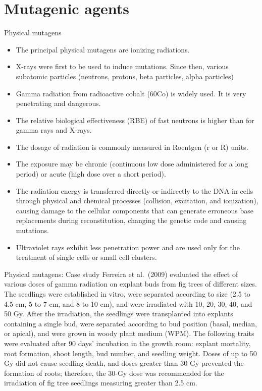 \documentclass[11pt,ignorenonframetext,aspectratio=169]{beamer}
\providecommand{\tightlist}{%
  \setlength{\itemsep}{0pt}\setlength{\parskip}{0pt}}
\begin{document}
\hypertarget{mutagenic-agents}{%
\section{Mutagenic agents}\label{mutagenic-agents}}

\begin{frame}{Physical mutagens}
\protect\hypertarget{physical-mutagens}{}
\begin{itemize}
\tightlist
\item
  The principal physical mutagens are ionizing radiations.
\item
  X-rays were first to be used to induce mutations. Since then, various
  subatomic particles (neutrons, protons, beta particles, alpha
  particles)
\item
  Gamma radiation from radioactive cobalt (60Co) is widely used. It is
  very penetrating and dangerous.
\item
  The relative biological effectiveness (RBE) of fast neutrons is higher
  than for gamma rays and X-rays.
\item
  The dosage of radiation is commonly measured in Roentgen (r or R)
  units.
\item
  The exposure may be chronic (continuous low dose administered for a
  long period) or acute (high dose over a short period).
\item
  The radiation energy is transferred directly or indirectly to the DNA
  in cells through physical and chemical processes (collision,
  excitation, and ionization), causing damage to the cellular components
  that can generate erroneous base replacements during reconstitution,
  changing the genetic code and causing mutations.
\item
  Ultraviolet rays exhibit less penetration power and are used only for
  the treatment of single cells or small cell clusters.
\end{itemize}
\end{frame}

\begin{frame}{Physical mutagens: Case study}
\protect\hypertarget{physical-mutagens-case-study}{}
Ferreira et al.~(2009) evaluated the effect of various doses of gamma
radiation on explant buds from fig trees of different sizes. The
seedlings were established in vitro, were separated according to size
(2.5 to 4.5 cm, 5 to 7 cm, and 8 to 10 cm), and were irradiated with 10,
20, 30, 40, and 50 Gy. After the irradiation, the seedlings were
transplanted into explants containing a single bud, were separated
according to bud position (basal, median, or apical), and were grown in
woody plant medium (WPM). The following traits were evaluated after 90
days' incubation in the growth room: explant mortality, root formation,
shoot length, bud number, and seedling weight. Doses of up to 50 Gy did
not cause seedling death, and doses greater than 30 Gy prevented the
formation of roots; therefore, the 30-Gy dose was recommended for the
irradiation of fig tree seedlings measuring greater than 2.5 cm.
\end{frame}
\end{document}
